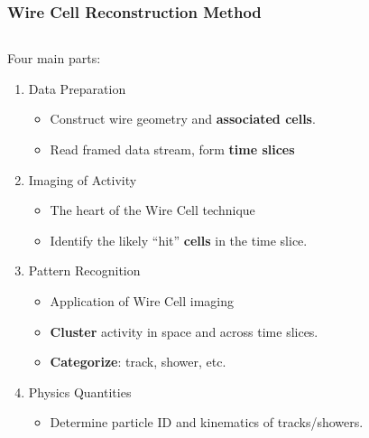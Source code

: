 \documentclass[xcolor=dvipsnames]{beamer}
\begin{document}
\begin{frame}[fragile]
  \frametitle{Wire Cell Reconstruction Method}
  \begin{columns}
    \begin{column}{0.7\textwidth}
      Four main parts:
      \begin{enumerate}
      \item<2> Data Preparation
        \begin{itemize}        \scriptsize
        \item Construct wire geometry and  \textbf{associated cells}.
        \item Read framed data stream, form \textbf{time slices}
        \end{itemize}
      \item<3> Imaging of Activity
        \begin{itemize}        \scriptsize
        \item The heart of the Wire Cell technique
        \item Identify the likely ``hit'' \textbf{cells} in the time slice.
        \end{itemize}
      \item<4> Pattern Recognition 
        \begin{itemize}         \scriptsize
        \item Application of Wire Cell imaging
        \item \textbf{Cluster} activity in space and across time slices.
        \item \textbf{Categorize}: track, shower, etc.
        \end{itemize}
      \item<5> Physics Quantities
        \begin{itemize}         \scriptsize
        \item Determine particle ID and kinematics of tracks/showers.
        \end{itemize}
      \end{enumerate}
    \end{column}
    \begin{column}{0.3\textwidth}
      \begin{center}
        \vspace{-10mm}
        \resizebox{!}{\textheight}{}
      \end{center}
    \end{column}
  \end{columns}

\end{frame}
\end{document}
